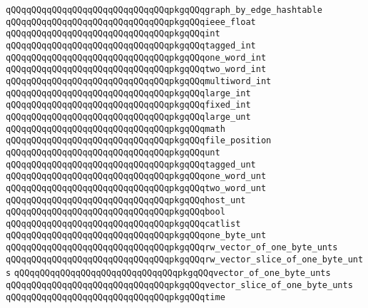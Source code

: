 \verb|qQQqqQQqqQQqqQQqqQQqqQQqqQQqqQQqpkgqQQqgraph_by_edge_hashtable|\newline
\verb|qQQqqQQqqQQqqQQqqQQqqQQqqQQqqQQqpkgqQQqieee_float|\newline
\verb|qQQqqQQqqQQqqQQqqQQqqQQqqQQqqQQqpkgqQQqint|\newline
\verb|qQQqqQQqqQQqqQQqqQQqqQQqqQQqqQQqpkgqQQqtagged_int|\newline
\verb|qQQqqQQqqQQqqQQqqQQqqQQqqQQqqQQqpkgqQQqone_word_int|\newline
\verb|qQQqqQQqqQQqqQQqqQQqqQQqqQQqqQQqpkgqQQqtwo_word_int|\newline
\verb|qQQqqQQqqQQqqQQqqQQqqQQqqQQqqQQqpkgqQQqmultiword_int|\newline
\verb|qQQqqQQqqQQqqQQqqQQqqQQqqQQqqQQqpkgqQQqlarge_int|\newline
\verb|qQQqqQQqqQQqqQQqqQQqqQQqqQQqqQQqpkgqQQqfixed_int|\newline
\verb|qQQqqQQqqQQqqQQqqQQqqQQqqQQqqQQqpkgqQQqlarge_unt|\newline
\verb|qQQqqQQqqQQqqQQqqQQqqQQqqQQqqQQqpkgqQQqmath|\newline
\verb|qQQqqQQqqQQqqQQqqQQqqQQqqQQqqQQqpkgqQQqfile_position|\newline
\verb|qQQqqQQqqQQqqQQqqQQqqQQqqQQqqQQqpkgqQQqunt|\newline
\verb|qQQqqQQqqQQqqQQqqQQqqQQqqQQqqQQqpkgqQQqtagged_unt|\newline
\verb|qQQqqQQqqQQqqQQqqQQqqQQqqQQqqQQqpkgqQQqone_word_unt|\newline
\verb|qQQqqQQqqQQqqQQqqQQqqQQqqQQqqQQqpkgqQQqtwo_word_unt|\newline
\verb|qQQqqQQqqQQqqQQqqQQqqQQqqQQqqQQqpkgqQQqhost_unt|\newline
\verb|qQQqqQQqqQQqqQQqqQQqqQQqqQQqqQQqpkgqQQqbool|\newline
\verb|qQQqqQQqqQQqqQQqqQQqqQQqqQQqqQQqpkgqQQqcatlist|\newline
\verb|qQQqqQQqqQQqqQQqqQQqqQQqqQQqqQQqpkgqQQqone_byte_unt|\newline
\verb|qQQqqQQqqQQqqQQqqQQqqQQqqQQqqQQqpkgqQQqrw_vector_of_one_byte_unts|\newline
\verb|qQQqqQQqqQQqqQQqqQQqqQQqqQQqqQQqpkgqQQqrw_vector_slice_of_one_byte_unts|\newline
\verb|qQQqqQQqqQQqqQQqqQQqqQQqqQQqqQQqpkgqQQqvector_of_one_byte_unts|\newline
\verb|qQQqqQQqqQQqqQQqqQQqqQQqqQQqqQQqpkgqQQqvector_slice_of_one_byte_unts|\newline
\verb|qQQqqQQqqQQqqQQqqQQqqQQqqQQqqQQqpkgqQQqtime|\newline
